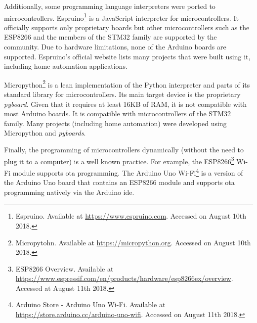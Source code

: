 Additionally, some programming language interpreters were ported to microcontrollers. Espruino\footnote{Espruino. Available at \url{https://www.espruino.com}. Accessed on August 10th 2018.} is a JavaScript interpreter for microcontrollers. It officially supports only proprietary boards but other microcontrollers such as the ESP8266 and the members of the STM32 family are supported by the community. Due to hardware limitations, none of the Arduino boards are supported. Espruino's official website lists many projects that were built using it, including home automation applications. 

Micropython\footnote{Micropytohn. Available at \url{https://micropython.org}. Accessed on August 10th 2018.} is a lean implementation of the Python interpreter and parts of its standard library for microcontrollers. Its main target device is the proprietary \textit{pyboard}. Given that it requires at least 16KB of RAM, it is not compatible with most Arduino boards. It is compatible with microcontrollers of the STM32 family. Many projects (including home automation) were developed using Micropython and \textit{pyboards}. 

Finally, the programming of microcontrollers dynamically (without the need to plug it to a computer) is a well known practice. For example, the ESP8266\footnote{ESP8266 Overview. Available at \url{https://www.espressif.com/en/products/hardware/esp8266ex/overview}. Accessed at August 11th 2018.} Wi-Fi module supports \ac{ota} programming. The Arduino Uno Wi-Fi\footnote{Arduino Store - Arduino Uno Wi-Fi. Available at \url{https://store.arduino.cc/arduino-uno-wifi}. Accessed on August 11th 2018.} is a version of the Arduino Uno board that contains an ESP8266 module and supports \ac{ota} programming natively via the Arduino \acs{ide}.